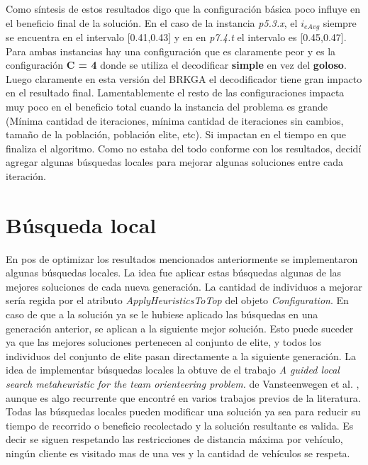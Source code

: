 Como síntesis de estos resultados digo que la configuración básica poco influye en el beneficio final de la solución. En el caso de la instancia \textit{p5.3.x}, el $i_{eAvg}$ siempre se encuentra en el intervalo [0.41,0.43] y en en \textit{p7.4.t} el intervalo es [0.45,0.47]. Para ambas instancias hay una configuración que es claramente peor y es la configuración \textbf{C = 4} donde se utiliza el decodificar \textbf{simple} en vez del \textbf{goloso}. Luego claramente en esta versión del BRKGA el decodificador tiene gran impacto en el resultado final. Lamentablemente el resto de las configuraciones impacta muy poco en el beneficio total cuando la instancia del problema es grande (Mínima cantidad de iteraciones, mínima cantidad de iteraciones sin cambios, tamaño de la población, población elite, etc). Si impactan en el tiempo en que finaliza el algoritmo. Como no estaba del todo conforme con los resultados, decidí agregar algunas búsquedas locales para mejorar algunas soluciones entre cada iteración.

\bigskip

\section{Búsqueda local}

En pos de optimizar los resultados mencionados anteriormente se implementaron algunas búsquedas locales. La idea fue aplicar estas búsquedas algunas de las mejores soluciones de cada nueva generación. La cantidad de individuos a mejorar sería regida por el atributo \textit{ApplyHeuristicsToTop} del objeto \textit{Configuration}. En caso de que a la solución ya se le hubiese aplicado las búsquedas en una generación anterior, se aplican a la siguiente mejor solución. Esto puede suceder ya que las mejores soluciones pertenecen al conjunto de elite, y todos los individuos del conjunto de elite pasan directamente a la siguiente generación. La idea de implementar búsquedas locales la obtuve de el trabajo \textit{A guided local search metaheuristic for the team orienteering problem.} de Vansteenwegen et al. \cite{VansteenwegenSouffriauBergheOudheusden}, aunque es algo recurrente que encontré en varios trabajos previos de la literatura. Todas las búsquedas locales pueden modificar una solución ya sea para reducir su tiempo de recorrido o beneficio recolectado y la solución resultante es valida. Es decir se siguen respetando las restricciones de distancia máxima por vehículo, ningún cliente es visitado mas de una ves y la cantidad de vehículos se respeta. 

